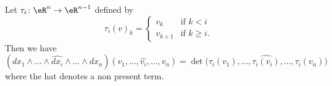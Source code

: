 \begin{lemma}    \label{LEMooICRXooFKPCRd}
	Let \( \tau_i\colon \eR^n\to \eR^{n-1}\) defined by
	\begin{equation}
		\tau_i(v)_k=\begin{cases}
			v_k     & \text{if } k<i             \\
			v_{k+1} & \text{if } k\geq i\text{.}
		\end{cases}
	\end{equation}
	Then we have
	\begin{equation}
		(dx_1\wedge\ldots\wedge\widehat{dx_i}\wedge\ldots\wedge dx_n)(v_1,\ldots, \widehat{v_i},\ldots, v_n)=
		\det\Big(  \tau_i(v_1),\ldots, \widehat{\tau_i(v_i)},\ldots, \tau_i(v_n)  \Big)
	\end{equation}
	where the hat denotes a non present term.
\end{lemma}

